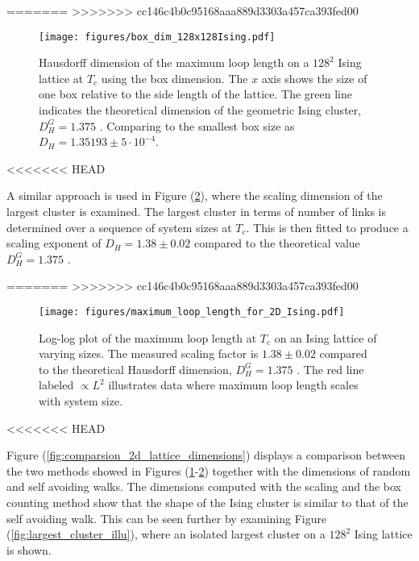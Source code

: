 =======
>>>>>>> cc146c4b0c95168aaa889d3303a457ca393fed00
\begin{figure}[h!]
    \centering
        \texttt{[image: figures/box\_dim\_128x128Ising.pdf]}
    \caption{Hausdorff dimension of the maximum loop length on a $128^2$ Ising lattice at $T_c$ using the box dimension. The $x$ axis shows the size of one box relative to the side length of the lattice. The green line indicates the theoretical dimension of the geometric Ising cluster, $D_H^G = 1.375$ \cite{Duplantier:GeoHausdorff}. Comparing to the smallest box size as $D_H = 1.35193 \pm 5 \cdot 10^{-4}$.}
    \label{fig:results_boxdimension}
\end{figure}

<<<<<<< HEAD
\newpage

A similar approach is used in Figure (\ref{fig:results_maxloopdimension}), where the scaling dimension of the largest cluster is examined. The largest cluster in terms of number of links is determined over a sequence of system sizes at $T_c$. This is then fitted to produce a scaling exponent of $D_H = 1.38 \pm 0.02$ compared to the theoretical value $D_H^G = 1.375$ \cite{Duplantier:GeoHausdorff}.


=======
>>>>>>> cc146c4b0c95168aaa889d3303a457ca393fed00
\begin{figure}[h!]
    \centering
        \texttt{[image: figures/maximum\_loop\_length\_for\_2D\_Ising.pdf]}
    \caption{Log-log plot of the maximum loop length at $T_c$ on an Ising lattice of varying sizes. The measured scaling factor is $1.38 \pm 0.02$ compared to the theoretical Hausdorff dimension, $D_H^G = 1.375$ \cite{Duplantier:GeoHausdorff}. The red line labeled $\propto L^2$ illustrates data where maximum loop length scales with system size.}
    \label{fig:results_maxloopdimension}
\end{figure}

<<<<<<< HEAD
\newpage

Figure (\ref{fig:comparsion_2d_lattice_dimensions}) displays a comparison between the two methods showed in Figures (\ref{fig:results_boxdimension}-\ref{fig:results_maxloopdimension}) together with the dimensions of random and self avoiding walks. The dimensions computed with the scaling and the box counting method show that the shape of the Ising cluster is similar to that of the self avoiding walk. This can be seen further by examining Figure (\ref{fig:largest_cluster_illu}), where an isolated largest cluster on a $128^2$ Ising lattice is shown.

